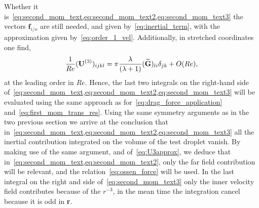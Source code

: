 Whether it is~\ref{eq:second_mom_text,eq:second_mom_text2,eq:second_mom_text3} the vectors $\textbf{f}_{i/o}$ are still needed, and given by~\ref{eq:inertial_term}, with the approximation given by~\ref{eq:order_1_vel}. 
Additionally, in stretched coordinates one find, 
\begin{equation}
    \frac{1}{Re}(\textbf{U}^{(3)})_{ijkl} =  \pi \frac{\lambda}{(\lambda+1)}(\wt{\textbf{G}})_{l i}\delta_{jk} + O(Re), 
    \label{eq:U3approx}
\end{equation}
at the leading order in $Re$. 
Hence, the last two integrals on the right-hand side of~\ref{eq:second_mom_text,eq:second_mom_text2,eq:second_mom_text3} will be evaluated using the same approach as for~\ref{eq:drag_force_application} and~\ref{eq:first_mom_trans_res}. 
Using the same symmetry arguments as in the two previous section we arrive at the conclusion that in~\ref{eq:second_mom_text,eq:second_mom_text2,eq:second_mom_text3} all the inertial contribution integrated on the volume of the test droplet vanish. 
By making use of the same argument, and of~\ref{eq:U3approx}, we deduce that in~\ref{eq:second_mom_text,eq:second_mom_text2}, only the far field contribution will be relevant, and the relation~\ref{eq:ossen_force} will be used. 
In the last integral on the right and side of~\ref{eq:second_mom_text3} only the inner velocity field contributes because of the $r^{-3}$, in the mean time the integration cancel because it is odd in \textbf{r}.

